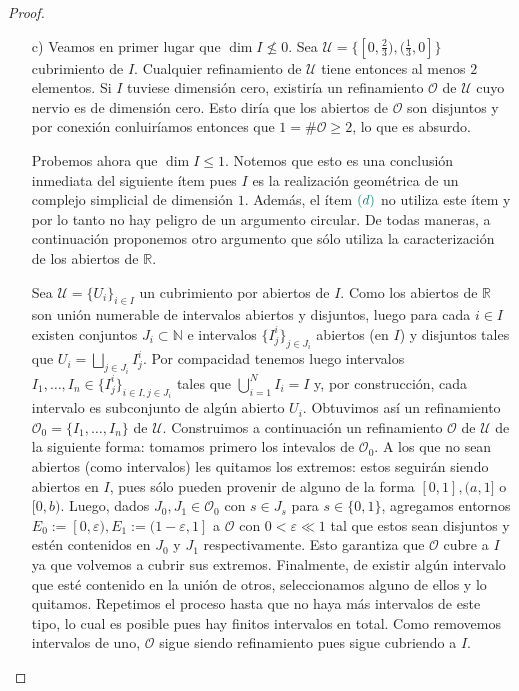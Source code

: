 \documentclass[11pt]{article}
\newcommand{\N}{\mathbb{N}}
\newcommand{\R}{\mathbb{R}}
\newcommand{\eps}{\varepsilon}
\newcommand{\paint}[2]{\color{#1}{#2}}
\begin{document}
\begin{proof}
\begin{itemize}
\item[c)] Veamos en primer lugar que $\dim I \not \leq 0$. Sea $\mathcal{U} = \{[0,\frac{2}{3}), (\frac{1}{3},0]\}$ cubrimiento de $I$. Cualquier refinamiento de $\mathcal{U}$ tiene entonces al menos $2$ elementos. Si $I$ tuviese dimensi\'on cero, existir\'ia un refinamiento $\mathcal{O}$ de $\mathcal{U}$ cuyo nervio es de dimensi\'on cero. Esto dir\'ia que los abiertos de $\mathcal{O}$ son disjuntos y por conexi\'on conluir\'iamos entonces que $1 = \#\mathcal{O} \geq 2$, lo que es absurdo. 

Probemos ahora que $\dim I \leq 1$. Notemos que esto es una conclusi\'on inmediata del siguiente \'item pues $I$ es la realizaci\'on geom\'etrica de un complejo simplicial de dimensi\'on $1$. Adem\'as, el \'item $\paint{grey-light-blue}{(d)}$ no utiliza este \'item y por lo tanto no hay peligro de un argumento circular. De todas maneras, a continuaci\'on proponemos otro argumento que s\'olo utiliza la caracterizaci\'on de los abiertos de $\R$. 

Sea $\mathcal{U} = \{U_i\}_{i \in I}$ un cubrimiento por abiertos de $I$. Como los abiertos de $\R$ son uni\'on numerable de intervalos abiertos y disjuntos, luego para cada $i \in I$ existen conjuntos $J_i \subset \N$ e intervalos $\{I^i_j\}_{j \in J_i}$ abiertos (en $I$) y disjuntos tales que $U_i = \bigsqcup_{j \in J_i}I_j^i$. Por compacidad tenemos luego intervalos $I_1, \dots, I_n \in \{I_j^i\}_{i \in I, j \in J_i}$ tales que $\bigcup_{i=1}^N I_i = I$ y, por construcci\'on, cada intervalo es subconjunto de alg\'un abierto $U_i$. Obtuvimos as\'i un refinamiento $\mathcal{O}_0 = \{I_1, \dots, I_n\}$ de $\mathcal{U}$. Construimos a continuaci\'on un refinamiento $\mathcal{O}$ de $\mathcal{U}$ de la siguiente forma: tomamos primero los intevalos de $\mathcal{O}_0$. A los que no sean abiertos (como intervalos) les quitamos los extremos: estos seguir\'an siendo abiertos en $I$, pues s\'olo pueden provenir de alguno de la forma $[0,1], (a,1]$ o $[0,b)$. Luego, dados $J_0,J_1 \in \mathcal{O}_0$ con $s \in J_s$ para $s \in \{0,1\}$, agregamos entornos $E_0 := [0,\eps), E_1 := (1-\eps,1]$ a $\mathcal{O}$ con $0 < \eps \ll 1$ tal que estos sean disjuntos y est\'en contenidos en $J_0$ y $J_1$ respectivamente. Esto garantiza que $\mathcal{O}$ cubre a $I$ ya que volvemos a cubrir sus extremos. Finalmente, de existir alg\'un intervalo que est\'e contenido en la uni\'on de otros, seleccionamos alguno de ellos y lo quitamos. Repetimos el proceso hasta que no haya m\'as intervalos de este tipo, lo cual es posible pues hay finitos intervalos en total. Como removemos intervalos de uno, $\mathcal{O}$ sigue siendo refinamiento pues sigue cubriendo a $I$. 


\end{itemize}
\end{proof}
\end{document}
